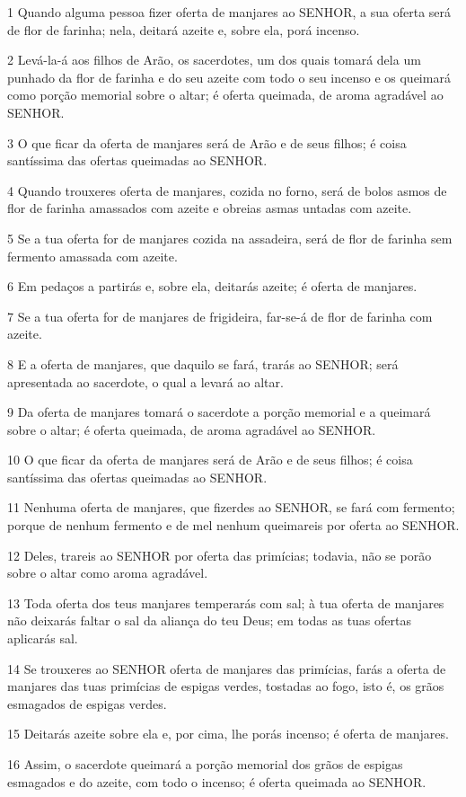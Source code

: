 \par 1 Quando alguma pessoa fizer oferta de manjares ao SENHOR, a sua oferta será de flor de farinha; nela, deitará azeite e, sobre ela, porá incenso.
\par 2 Levá-la-á aos filhos de Arão, os sacerdotes, um dos quais tomará dela um punhado da flor de farinha e do seu azeite com todo o seu incenso e os queimará como porção memorial sobre o altar; é oferta queimada, de aroma agradável ao SENHOR.
\par 3 O que ficar da oferta de manjares será de Arão e de seus filhos; é coisa santíssima das ofertas queimadas ao SENHOR.
\par 4 Quando trouxeres oferta de manjares, cozida no forno, será de bolos asmos de flor de farinha amassados com azeite e obreias asmas untadas com azeite.
\par 5 Se a tua oferta for de manjares cozida na assadeira, será de flor de farinha sem fermento amassada com azeite.
\par 6 Em pedaços a partirás e, sobre ela, deitarás azeite; é oferta de manjares.
\par 7 Se a tua oferta for de manjares de frigideira, far-se-á de flor de farinha com azeite.
\par 8 E a oferta de manjares, que daquilo se fará, trarás ao SENHOR; será apresentada ao sacerdote, o qual a levará ao altar.
\par 9 Da oferta de manjares tomará o sacerdote a porção memorial e a queimará sobre o altar; é oferta queimada, de aroma agradável ao SENHOR.
\par 10 O que ficar da oferta de manjares será de Arão e de seus filhos; é coisa santíssima das ofertas queimadas ao SENHOR.
\par 11 Nenhuma oferta de manjares, que fizerdes ao SENHOR, se fará com fermento; porque de nenhum fermento e de mel nenhum queimareis por oferta ao SENHOR.
\par 12 Deles, trareis ao SENHOR por oferta das primícias; todavia, não se porão sobre o altar como aroma agradável.
\par 13 Toda oferta dos teus manjares temperarás com sal; à tua oferta de manjares não deixarás faltar o sal da aliança do teu Deus; em todas as tuas ofertas aplicarás sal.
\par 14 Se trouxeres ao SENHOR oferta de manjares das primícias, farás a oferta de manjares das tuas primícias de espigas verdes, tostadas ao fogo, isto é, os grãos esmagados de espigas verdes.
\par 15 Deitarás azeite sobre ela e, por cima, lhe porás incenso; é oferta de manjares.
\par 16 Assim, o sacerdote queimará a porção memorial dos grãos de espigas esmagados e do azeite, com todo o incenso; é oferta queimada ao SENHOR.

